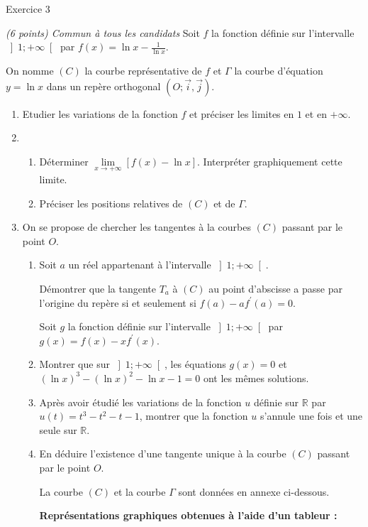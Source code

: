 
%
\begin{h2}Exercice 3\end{h2}
\textit{ (6 points) Commun à tous les candidats}
Soit $ f $ la fonction définie sur l'intervalle $\left]1; +\infty \right[$ par $f\left(x\right)=\ln x-\frac{1}{\ln x}$.
\par
On nomme $\left(C\right)$ la courbe représentative de $f$ et $\Gamma $ la courbe d'équation $y=\ln x$ dans un repère orthogonal $\left(O; \vec{i}, \vec{j}\right)$.
\begin{enumerate}
     \item
     Etudier les variations de la fonction $f$ et préciser les limites en $1$ et en $+\infty $.
     \item

     \begin{enumerate}
          \item
          Déterminer $\lim\limits_{x \rightarrow +\infty }\left[f\left(x\right)-\ln x\right]$. Interpréter graphiquement cette limite.
          \item
          Préciser les positions relatives de $\left(C\right)$ et de $\Gamma $.
     \end{enumerate}
     \item
     On se propose de chercher les tangentes à la courbes $\left(C\right)$ passant par le point $O$.
     \begin{enumerate}
          \item
          Soit $a$ un réel appartenant à l'intervalle $\left]1; +\infty \right[$.
          \par
          Démontrer que la tangente $T_{a}$ à $\left(C\right)$  au point d'abscisse a passe par l'origine du repère si et seulement si $f\left(a\right)-a f^{\prime}\left(a\right)=0$.
          \par
          Soit $g$ la fonction définie sur l'intervalle $\left]1; +\infty \right[$ par $g\left(x\right)=f\left(x\right)-x f^{\prime} \left(x\right)$.
          \item
          Montrer que sur $\left]1; +\infty \right[$, les équations $g\left(x\right)=0$  et $\left(\ln x\right)^{3}-\left(\ln x\right)^{2}-\ln x-1=0$ ont les mêmes solutions.
          \item
          Après avoir étudié les variations de la fonction $u$ définie sur $\mathbb{R}$ par $u\left(t\right)=t^{3}-t^{2}-t-1$, montrer que la fonction $u$ s'annule une fois et une seule sur $\mathbb{R}$.
          \item
          En déduire l'existence d'une tangente unique à la courbe $\left(C\right)$ passant par le point $O$.
          \par
          La courbe $\left(C\right)$ et la courbe $\Gamma $ sont données en annexe ci-dessous.
\begin{center}
 \textbf{Représentations graphiques obtenues à l'aide d'un tableur :}
\end{center}


\end{enumerate}
\end{enumerate}
